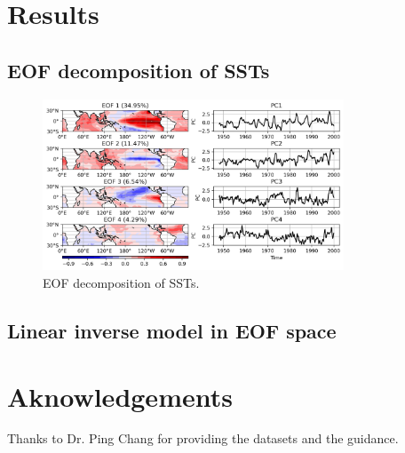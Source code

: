 \documentclass[12pt,a4paper]{article}
\begin{document}
\section{Results}\label{results}

\subsection{EOF decomposition of SSTs}\label{eof-decomposition}

\begin{figure}[htbp]
\centering
\includegraphics[width=0.8\textwidth]{figures/EOFs_PCs.png}
\caption{EOF decomposition of SSTs.}
\label{fig:EOFs_PCs}
\end{figure}

\subsection{Linear inverse model in EOF space}\label{lim-eof-space}

\section{Aknowledgements}\label{acknowledgements}

Thanks to Dr. Ping Chang for providing the datasets and the guidance.



\end{document}
